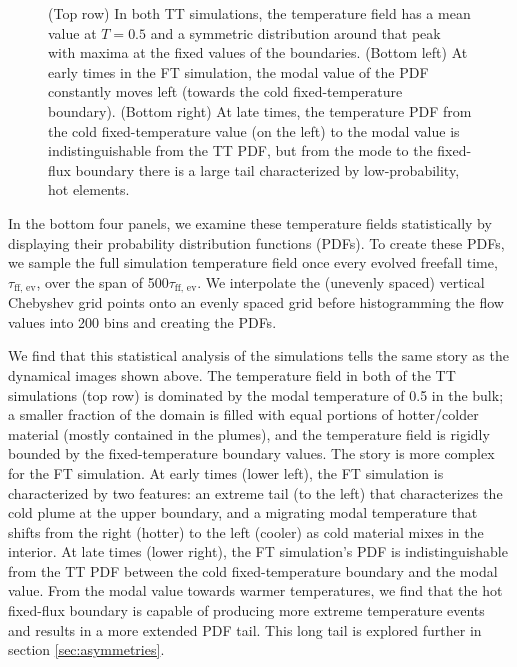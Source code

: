 \documentclass[aps, pre, onecolumn, nofootinbib, notitlepage, groupedaddress, amsfonts, amssymb, amsmath, longbibliography, superscriptaddress]{revtex4-1}
\begin{document}
\begin{figure}[p!]
{	(Top row) In both TT simulations, the temperature field has a mean value at $T = 0.5$ and a symmetric distribution around that peak with maxima at the fixed values of the boundaries. 
	(Bottom left) At early times in the FT simulation, the modal value of the PDF constantly moves left (towards the cold fixed-temperature boundary).
	(Bottom right) At late times, the temperature PDF from the cold fixed-temperature value (on the left) to the modal value is indistinguishable from the TT PDF, but from the mode to the fixed-flux boundary there is a large tail characterized by low-probability, hot elements.
	\label{fig:rbc_evolution_dynamics} }
\end{figure}



In the bottom four panels, we examine these temperature fields statistically by displaying their probability distribution functions (PDFs).
To create these PDFs, we sample the full simulation temperature field once every evolved freefall time, $\tau_{\text{ff, ev}}$, over the span of 500$\tau_{\text{ff, ev}}$.
We interpolate the (unevenly spaced) vertical Chebyshev grid points onto an evenly spaced grid before histogramming the flow values into 200 bins and creating the PDFs.

We find that this statistical analysis of the simulations tells the same story as the dynamical images shown above.
The temperature field in both of the TT simulations (top row) is dominated by the modal temperature of 0.5 in the bulk; a smaller fraction of the domain is filled with equal portions of hotter/colder material (mostly contained in the plumes), and the temperature field is rigidly bounded by the fixed-temperature boundary values.
The story is more complex for the FT simulation.
At early times (lower left), the FT simulation is characterized by two features: an extreme tail (to the left) that characterizes the cold plume at the upper boundary, and a migrating modal temperature that shifts from the right (hotter) to the left (cooler) as cold material mixes in the interior.
At late times (lower right), the FT simulation's PDF is indistinguishable from the TT PDF between the cold fixed-temperature boundary and the modal value.
From the modal value towards warmer temperatures, we find that the hot fixed-flux boundary is capable of producing more extreme temperature events and results in a more extended PDF tail.
This long tail is explored further in section \ref{sec:asymmetries}.
\end{document}

